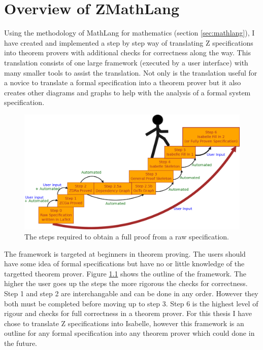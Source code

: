 
\chapter{Overview of ZMathLang}
\label{ch:design}

Using the methodology of MathLang for mathematics (section \ref{sec:mathlang}), I have created and implemented a step by step way of translating Z specifications into theorem provers with additional checks for correctness along the way. This translation consists of one large framework (executed by a user interface) with many smaller tools to assist the translation. Not only is the translation useful for a novice to translate a formal specification into a theorem prover but it also creates other diagrams and graphs to help with the analysis of a formal system specification.

\begin{figure}[H]
 \begin{center}
 \includegraphics [width=12cm]{Figures/Design/mathlangsteps.png}
 \caption{The steps required to obtain a full proof from a raw specification.}
 \label{fig:steps}
\end{center}
\end{figure} 

The framework is targeted at beginners in theorem proving. The users should have some idea of formal specifications but have no or little knowledge of the targetted theorem prover. Figure \ref{fig:steps} shows the outline of the framework. The higher the user goes up the steps the more rigorous the checks for correctness. Step 1 and step 2 are interchangable and can be done in any order. However they both must be completed before moving up to step 3. Step 6 is the highest level of rigour and checks for full correctness in a theorem prover. For this thesis I have chose to translate Z specifications into Isabelle, however this framework is an outline for any formal specification into any theorem prover which could done in the future.

